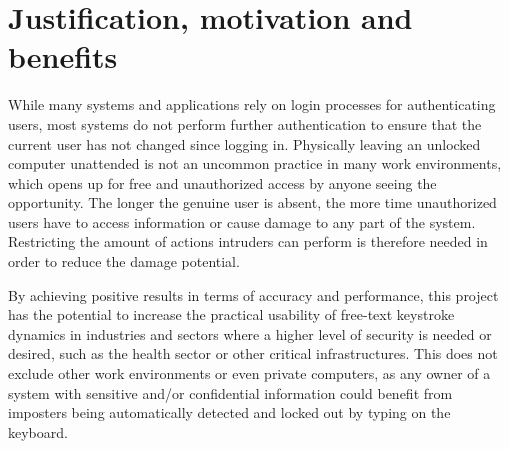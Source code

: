 \documentclass[informationsecurity]{gucmasterproject}
\begin{document}
\section{Justification, motivation and benefits}
While many systems and applications rely on login processes for authenticating users, most systems do not perform further authentication to ensure that the current user has not changed since logging in.
Physically leaving an unlocked computer unattended is not an uncommon practice in many work environments, which opens up for free and unauthorized access by anyone seeing the opportunity.
The longer the genuine user is absent, the more time unauthorized users have to access information or cause damage to any part of the system.
Restricting the amount of actions intruders can perform is therefore needed in order to reduce the damage potential.

By achieving positive results in terms of accuracy and performance, this project has the potential to increase the practical usability of free-text keystroke dynamics in industries and sectors where a higher level of security is needed or desired, such as the health sector or other critical infrastructures.
This does not exclude other work environments or even private computers, as any owner of a system with sensitive and/or confidential information could benefit from imposters being automatically detected and locked out by typing on the keyboard.


%
\end{document}
